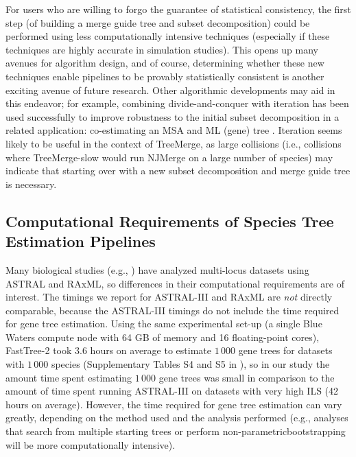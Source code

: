 For users who are willing to forgo the guarantee of statistical consistency, the first step (of building a merge guide tree and subset decomposition) could be performed using less computationally intensive techniques (especially if these techniques are highly accurate in simulation studies).
This opens up many avenues for algorithm design, and of course, determining whether these new techniques enable pipelines to be provably statistically consistent is another exciting avenue of future research.
Other algorithmic developments may aid in this endeavor; for example, combining divide-and-conquer with iteration has been used successfully to improve robustness to the initial subset decomposition in a related application: co-estimating an MSA and ML (gene) tree \cite{Liu2009rapid-sate, liu2012very-sate2, nelesen2012dactal, mirarab2015pasta}.
Iteration seems likely to be useful in the context of TreeMerge, as large collisions (i.e., collisions where TreeMerge-slow would run NJMerge on a large number of species) may indicate that starting over with a new subset decomposition and merge guide tree is necessary.

\subsection{Computational Requirements of Species Tree Estimation Pipelines} 
Many biological studies (e.g., \cite{wickett2014phylo,prum2015comprehensive}) have analyzed multi-locus datasets using ASTRAL and RAxML, so differences in their computational requirements are of interest.
The timings we report for ASTRAL-III and RAxML are {\em not} directly comparable, because the ASTRAL-III timings do not include the time required for gene tree estimation.
Using the same experimental set-up (a single Blue Waters compute node with 64 GB of memory and 16 floating-point cores), FastTree-2 took $3.6$ hours on average to estimate  $1\,000$ gene trees for datasets with  $1\,000$ species (Supplementary Tables S4 and S5 in \cite{molloy2019statistically}), so in our study the amount time spent estimating  $1\,000$ gene trees was small in comparison to the amount of time spent running ASTRAL-III on datasets with very high ILS (42 hours on average).
However, the time required for gene tree estimation can vary greatly, depending on the method used and the analysis performed (e.g., analyses that search from multiple starting trees or perform \gls{non-parametricbootstrapping} will be more computationally intensive).

